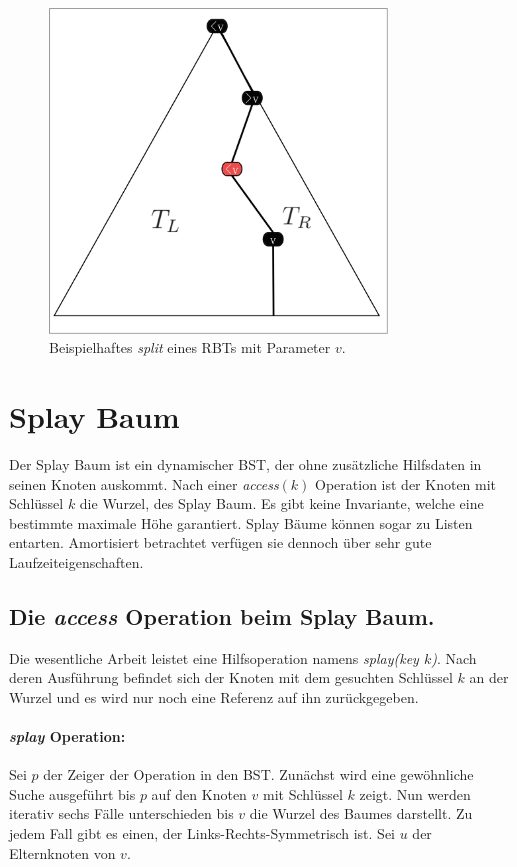 \documentclass[a4paper,12pt]{article}
\begin{document}
\begin{figure}[H]
	\centering
	\includegraphics[width=0.8\textwidth]{Medien/RotSchwarzBaum/aufteilen}
	\caption{Beispielhaftes \textit{split} eines RBTs mit Parameter $v$. }
	\label{fig:aufteilen}
\end{figure}


\section{Splay Baum}
Der  Splay Baum \cite{splay} ist ein dynamischer BST, der ohne zusätzliche Hilfsdaten in seinen Knoten auskommt. Nach einer \textit{access}$\left(k\right)$ Operation ist der Knoten mit Schlüssel $k$ die Wurzel, des Splay Baum. Es gibt keine Invariante, welche eine bestimmte maximale Höhe garantiert. Splay Bäume können sogar zu Listen entarten. Amortisiert betrachtet verfügen sie dennoch über sehr gute Laufzeiteigenschaften. 


\subsection{Die \textit{access} Operation beim Splay Baum. }
Die wesentliche Arbeit leistet eine Hilfsoperation namens \textit{splay(key $k$)}. Nach deren Ausführung befindet sich der Knoten mit dem gesuchten Schlüssel $k$ an der Wurzel und es wird nur noch eine Referenz auf ihn zurückgegeben.

\paragraph{\textit{splay} Operation:}
Sei $p$ der Zeiger der Operation in den BST. Zunächst wird eine gewöhnliche Suche ausgeführt bis $p$ auf den Knoten $v$ mit Schlüssel $k$ zeigt. Nun werden iterativ sechs Fälle unterschieden bis $v$ die Wurzel des Baumes darstellt. Zu jedem Fall gibt es einen, der Links-Rechts-Symmetrisch ist. Sei $u$ der Elternknoten von $v$. 
\end{document}
